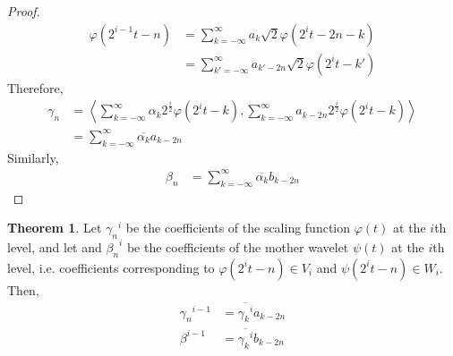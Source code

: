 \documentclass[titlepage, fleqn, a4paper, 12pt, twoside]{article}
\theoremstyle{definition}
\theoremstyle{theorem}
\newtheorem{theorem}{Theorem}
\begin{document}
\begin{proof}
\begin{align*}
		\varphi\left( 2^{i - 1} t - n \right) &= \sum\limits_{k = -\infty}^{\infty} a_k \sqrt{2} \varphi\left( 2^i t - 2 n - k \right)\\
		&= \sum\limits_{k' = -\infty}^{\infty} a_{k' - 2 n} \sqrt{2} \varphi\left( 2^i t - k' \right)
	\end{align*}
	Therefore,
	\begin{align*}
		\gamma_n &= \left\langle \sum\limits_{k = -\infty}^{\infty} \alpha_k 2^{\frac{i}{2}} \varphi\left( 2^i t - k \right) , \sum\limits_{k = -\infty}^{\infty} a_{k - 2 n} 2^{\frac{i}{2}} \varphi\left( 2^i t - k \right) \right\rangle\\
		&= \sum\limits_{k = -\infty}^{\infty} \overline{\alpha_k} a_{k - 2 n}
	\end{align*}
	Similarly,
	\begin{align*}
		\beta_n &= \sum\limits_{k = -\infty}^{\infty} \overline{\alpha_k} b_{k - 2 n}
	\end{align*}
\end{proof}

\begin{theorem}
	Let ${\gamma_n}^i$ be the coefficients of the scaling function $\varphi(t)$ at the $i$th level, and let and ${\beta_n}^i$ be the coefficients of the mother wavelet $\psi(t)$ at the $i$th level, i.e. coefficients corresponding to $\varphi\left( 2^i t - n \right) \in V_i$ and $\psi\left( 2^i t - n \right) \in W_{i}$.
	Then,
	\begin{align*}
		{\gamma_n}^{i - 1} &= \overline{{\gamma_k}^i} a_{k - 2 n}\\
		{\beta}^{i - 1} &= \overline{{\gamma_k}^i} b_{k - 2 n}
	\end{align*}
\end{theorem}


\clearpage
\printindex
\end{document}
